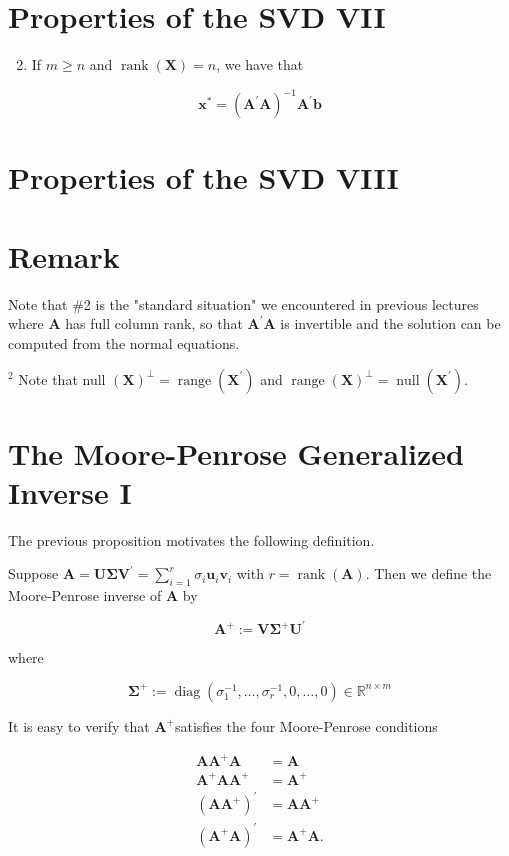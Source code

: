\documentclass[11pt]{article}
\theoremstyle{plain} %
\theoremstyle{remark}
\begin{document}
\section*{Properties of the SVD VII}
\begin{enumerate}
  \setcounter{enumi}{1}
  \item If $m \geq n$ and $\operatorname{rank}(\mathbf{X})=n$, we have that
\end{enumerate}

$$
\mathbf{x}^{*}=\left(\mathbf{A}^{\prime} \mathbf{A}\right)^{-1} \mathbf{A}^{\prime} \mathbf{b}
$$

\section*{Properties of the SVD VIII}
\section*{Remark}
Note that \#2 is the "standard situation" we encountered in previous lectures where $\mathbf{A}$ has full column rank, so that $\mathbf{A}^{\prime} \mathbf{A}$ is invertible and the solution can be computed from the normal equations.

${ }^{2}$ Note that null $(\mathbf{X})^{\perp}=\operatorname{range}\left(\mathbf{X}^{\prime}\right)$ and $\operatorname{range}(\mathbf{X})^{\perp}=\operatorname{null}\left(\mathbf{X}^{\prime}\right)$.

\section*{The Moore-Penrose Generalized Inverse I}
The previous proposition motivates the following definition.

Suppose $\mathbf{A}=\mathbf{U} \boldsymbol{\Sigma} \mathbf{V}^{\prime}=\sum_{i=1}^{r} \sigma_{i} \mathbf{u}_{i} \mathbf{v}_{i}$ with $r=\operatorname{rank}(\mathbf{A})$. Then we define the Moore-Penrose inverse of $\mathbf{A}$ by

$$
\mathbf{A}^{+}:=\mathbf{V} \boldsymbol{\Sigma}^{+} \mathbf{U}^{\prime}
$$

where

$$
\boldsymbol{\Sigma}^{+}:=\operatorname{diag}\left(\sigma_{1}^{-1}, \ldots, \sigma_{r}^{-1}, 0, \ldots, 0\right) \in \mathbb{R}^{n \times m}
$$

It is easy to verify that $\mathbf{A}^{+}$satisfies the four Moore-Penrose conditions

$$
\begin{aligned}
\mathbf{A A}^{+} \mathbf{A} & =\mathbf{A} \\
\mathbf{A}^{+} \mathbf{A} \mathbf{A}^{+} & =\mathbf{A}^{+} \\
\left(\mathbf{A A}^{+}\right)^{\prime} & =\mathbf{A A}^{+} \\
\left(\mathbf{A}^{+} \mathbf{A}\right)^{\prime} & =\mathbf{A}^{+} \mathbf{A} .
\end{aligned}
$$
\end{document}

